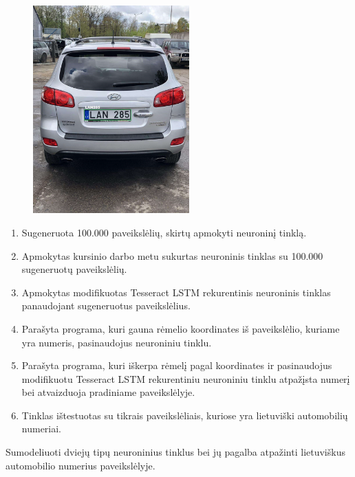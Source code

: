 \documentclass{VUMIFInfBakalaurinis}
\begin{document}
\begin{subfigure}{\linewidth}
  \centering
  \includegraphics[width=6cm]{cars/lan285.jpg}
  \label{LAN285}
\end{subfigure}



\pagebreak
{}
\begin{enumerate}[itemsep=0.5pt]%
  \item Sugeneruota 100.000 paveikslėlių, skirtų apmokyti neuroninį tinklą.
  \item Apmokytas kursinio darbo metu sukurtas neuroninis tinklas su 100.000 sugeneruotų paveikslėlių.
  \item Apmokytas modifikuotas Tesseract LSTM rekurentinis neuroninis tinklas panaudojant sugeneruotus paveikslėlius.
  \item Parašyta programa, kuri gauna rėmelio koordinates iš paveikslėlio, kuriame yra numeris, pasinaudojus neuroniniu tinklu.
  \item Parašyta programa, kuri iškerpa rėmelį pagal koordinates ir pasinaudojus modifikuotu Tesseract LSTM rekurentiniu neuroniniu tinklu atpažįsta numerį bei atvaizduoja pradiniame paveikslėlyje.
  \item Tinklas ištestuotas su tikrais paveikslėliais, kuriose yra lietuviški automobilių numeriai.
\end{enumerate}

Sumodeliuoti dviejų tipų neuroninius tinklus bei jų pagalba atpažinti lietuviškus automobilio numerius paveikslėlyje.
\end{document}
